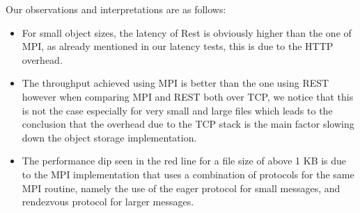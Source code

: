 \documentclass[runningheads]{llncs}
\begin{document}
Our observations and interpretations are as follows:
\begin{itemize}
  \item For small object sizes, the latency of Rest is obviously higher than the one of MPI, as already mentioned in our latency tests, this is due to the HTTP overhead.
  \item The throughput achieved using MPI is better than the one using REST however when comparing MPI and REST both over TCP, we notice that this is not the case especially for very small and large files which leads to the conclusion that the overhead due to the TCP stack is the main factor slowing down the object storage implementation.
  \item The performance dip seen in the red line for a file size of above 1 KB is due to the MPI implementation that uses a combination of protocols for the same MPI routine, namely the use of the eager protocol \cite{eager} for small messages, and rendezvous protocol for larger messages.
\end{itemize}
\end{document}
